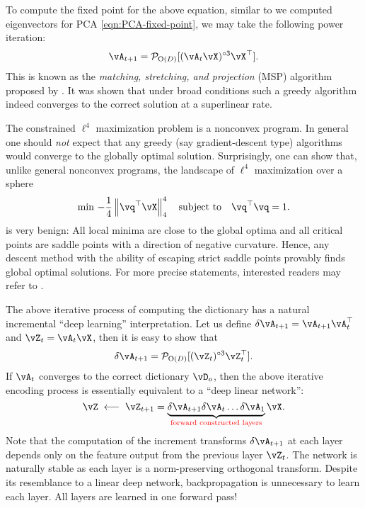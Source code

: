 \documentclass[\toplevelprefix/book-main.tex]{subfiles}
\begin{document}
To compute the fixed point for the above equation, similar to we computed eigenvectors for PCA \eqref{eqn:PCA-fixed-point}, we may take the following power iteration:
\begin{equation}\label{eq:msp_iteration}
    \vA_{t+1} = \mathcal{P}_{\mathrm O(D)}[( {\vA_t \vX})^{\circ3}\vX^\top].
\end{equation}
This is known as the {\em matching, stretching, and projection} (MSP) algorithm proposed by \cite{Zhai-2020}. It was shown that under broad conditions such a greedy algorithm indeed converges to the correct solution at a superlinear rate.

\begin{remark}\label{rem:L4-global}
The constrained $\ell^4$ maximization problem is a nonconvex program. In general one should \textit{not} expect that any greedy (say gradient-descent type) algorithms would converge to the globally optimal solution. Surprisingly, one can show that, unlike general nonconvex programs, the landscape of $\ell^4$ maximization over a sphere
\begin{equation}\label{eq:l4-maximization-sphere}
    \min\,
    -   \frac{1}{4} \norm*{
    \vq^\top \vX
    }_4^4 \quad \mbox{subject to} \quad  \vq^\top\vq = 1.
\end{equation}
is very benign: All local minima are close to the global optima and all critical points are saddle points with a direction of negative curvature. Hence, any descent method with the ability of escaping strict saddle points provably finds global optimal solutions. For more precise statements, interested readers may refer to \cite{Qu2020Geometric}. 
\end{remark}

\begin{remark}
The above iterative process of computing the dictionary has a natural incremental ``deep learning'' interpretation. Let us define 
$\delta \vA_{t+1} = \vA_{t+1}\vA_{t}^\top$ and $\vZ_t = \vA_t \vX$, then it is easy to show that
$$\delta \vA_{t+1} = \mathcal{P}_{\mathrm O(D)}[(\vZ_t)^{\circ3} \vZ_t^\top].$$ 
If $\vA_t$ converges to the correct dictionary $\vD_o$, then the above iterative encoding process is essentially equivalent to a ``deep linear network'': 
$$\vZ \; \longleftarrow \; \vZ_{t+1} =  \underbrace{\delta \vA_{t+1} \delta \vA_{t} \ldots \delta \vA_{1}}_{\color{red} \text{forward constructed layers}} \vX.$$
Note that the computation of the increment transforms $\delta \vA_{t+1}$ at each layer depends only on the feature output from the previous layer $\vZ_t$. The network is naturally stable as each layer is a norm-preserving orthogonal transform. Despite its resemblance to a linear deep network, backpropagation is unnecessary to learn each layer. All layers are learned in one forward pass!
\end{remark}
\end{document}
